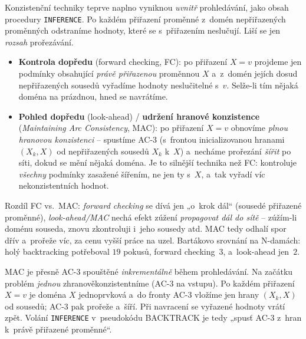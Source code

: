 Konzistenční techniky teprve naplno vyniknou \emph{uvnitř} prohledávání, jako obsah procedury \texttt{INFERENCE}. Po každém přiřazení proměnné z~domén nepřiřazených proměnných odstraníme hodnoty, které se s~přiřazením neslučují. Liší se jen \emph{rozsah} prořezávání.

\begin{definice}
\begin{itemize}
  \item \textbf{Kontrola dopředu} (forward checking, FC): po přiřazení $X=v$ projdeme jen podmínky obsahující \emph{právě přiřazenou} proměnnou $X$ a~z~domén jejích dosud nepřiřazených sousedů vyřadíme hodnoty neslučitelné s~$v$. Selže-li tím nějaká doména na prázdnou, hned se navrátíme.
  \item \textbf{Pohled dopředu} (look-ahead) / \textbf{udržení hranové konzistence} (\emph{Maintaining Arc Consistency}, MAC): po přiřazení $X=v$ obnovíme \emph{plnou hranovou konzistenci} -- spustíme AC-3 (s~frontou inicializovanou hranami $(X_k,X)$ od nepřiřazených sousedů $X_k$ k~$X$) a~necháme prořezání \emph{šířit} po síti, dokud se mění nějaká doména. Je to silnější technika než FC: kontroluje \emph{všechny} podmínky zasažené šířením, ne jen ty s~$X$, a~tak vyřadí víc nekonzistentních hodnot.
\end{itemize}
\end{definice}

\begin{intuice}
Rozdíl FC vs.\ MAC: \emph{forward checking} se dívá jen „o~krok dál`` (sousedé přiřazené proměnné), \emph{look-ahead/MAC} nechá efekt zúžení \emph{propagovat dál do sítě} -- zúžím-li doménu souseda, znovu zkontroluji i~jeho sousedy atd. MAC tedy odhalí spor dřív a~prořeže víc, za cenu vyšší práce na uzel. Bartákovo srovnání na N-damách: holý backtracking potřeboval $19$ pokusů, forward checking~$3$, a~look-ahead jen~$2$.
\end{intuice}

\begin{poznamka}[MAC $=$ AC-3 inkrementálně]
MAC je přesně AC-3 spouštěné \emph{inkrementálně} během prohledávání. Na začátku problém \emph{jednou} zhranověkonzistentníme (AC-3 na vstupu). Po každém přiřazení $X=v$ je doména $X$ jednoprvková a~do fronty AC-3 vložíme jen hrany $(X_k,X)$ od sousedů; AC-3 pak prořeže a~šíří. Při navracení se vyřazené hodnoty vrátí zpět. Volání \texttt{INFERENCE} v~pseudokódu BACKTRACK je tedy „spusť AC-3 z~hran k~právě přiřazené proměnné``.
\end{poznamka}

